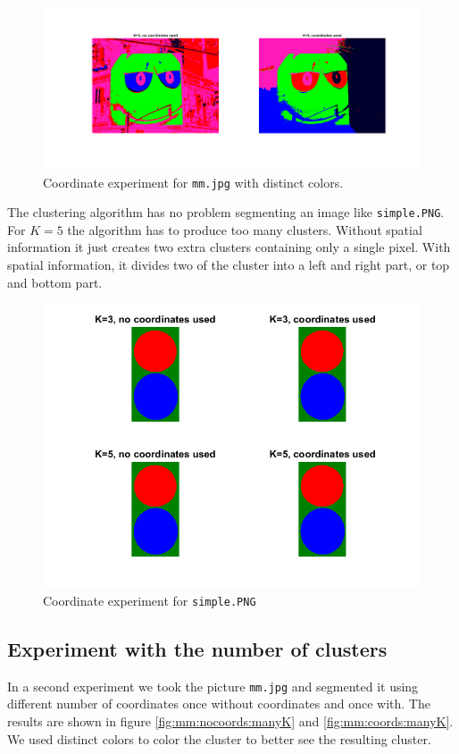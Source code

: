 \begin{figure}[h!]
\centering
\includegraphics[width = 0.9\linewidth]{figures/task2/mm_bad_visibility.png}
\caption{Coordinate experiment for \texttt{mm.jpg} with distinct colors.}
\label{fig:mm:coords:distinct}
\end{figure}

The clustering algorithm has no problem segmenting an image like \texttt{simple.PNG}. For $K=5$ the algorithm has to produce too many clusters. Without spatial information it just creates two extra clusters containing only a single pixel. With spatial information, it divides two of the cluster into a left and right part, or top and bottom part.

\begin{figure}[h!]
\centering
\includegraphics[width = 0.7\linewidth]{figures/task2/simple_coordinates.png}
\caption{Coordinate experiment for \texttt{simple.PNG}}
\label{fig:simple:coords}
\end{figure}

\subsection{Experiment with the number of clusters}
In a second experiment we took the picture \texttt{mm.jpg} and segmented it using different number of coordinates once without coordinates and once with. The results are shown in figure \ref{fig:mm:nocoords:manyK} and \ref{fig:mm:coords:manyK}. We used distinct colors to color the cluster to better see the resulting cluster.

